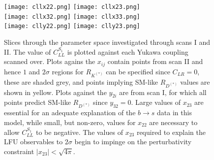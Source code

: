 \begin{figure}
    \texttt{[image: cllx22.png]} \hfill
    \texttt{[image: cllx23.png]}\\
    \texttt{[image: cllx32.png]} \hfill
    \texttt{[image: cllx33.png]} \\
    \texttt{[image: clly22.png]} \hfill
    \texttt{[image: clly23.png]}
    \caption[Slices through the parameter space investigated through scans I and
    II.]{Slices through the parameter space investigated through scans I and II.
      The value of $C_{LL}^{S_{1}}$ is plotted against each Yukawa coupling scanned
      over. Plots agains the $x_{ij}$ contain points from scan II and hence $1$
      and $2\sigma$ regions for $R_{K^{(*)}}$ can be specified since
      $C_{LR} = 0$, these are shaded grey, and points implying SM-like
      $R_{D^{(*)}}$ values are shown in yellow. Plots against the $y_{2i}$ are
      from scan I, for which all points predict SM-like $R_{D^{(*)}}$ since
      $y_{32} = 0$. Large values of $x_{23}$ are essential for an adequate
      explanation of the $b \to s$ data in this model, while small, but
      non-zero, values for $x_{22}$ are necessary to allow $C_{LL}^{S_{1}}$ to be
      negative. The values of $x_{23}$ required to explain the LFU observables
      to $2\sigma$ begin to impinge on the perturbativity constraint
      $|x_{23}| < \sqrt{4\pi}$.}
  \label{fig:ch3-rkscans}
\end{figure}

